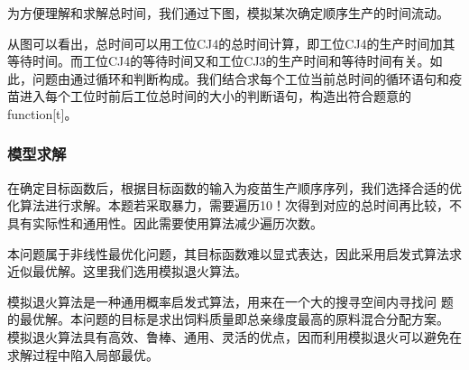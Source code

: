 \documentclass[UTF8]{ctexart}
\begin{document}
	为方便理解和求解总时间，我们通过下图，模拟某次确定顺序生产的时间流动。

	从图可以看出，总时间可以用工位CJ4的总时间计算，即工位CJ4的生产时间加其等待时间。而工位CJ4的等待时间又和工位CJ3的生产时间和等待时间有关。如此，问题由通过循环和判断构成。我们结合求每个工位当前总时间的循环语句和疫苗进入每个工位时前后工位总时间的大小的判断语句，构造出符合题意的function[t]。
	
	\subsubsection{模型求解}
	
	在确定目标函数后，根据目标函数的输入为疫苗生产顺序序列，我们选择合适的优化算法进行求解。本题若采取暴力，需要遍历10！次得到对应的总时间再比较，不具有实际性和通用性。因此需要使用算法减少遍历次数。
	
	本问题属于非线性最优化问题，其目标函数难以显式表达，因此采用启发式算法求近似最优解。这里我们选用模拟退火算法。 
	
	模拟退火算法是一种通用概率启发式算法，用来在一个大的搜寻空间内寻找问 题的最优解。本问题的目标是求出饲料质量即总亲缘度最高的原料混合分配方案。 模拟退火算法具有高效、鲁棒、通用、灵活的优点，因而利用模拟退火可以避免在 求解过程中陷入局部最优。
	
\end{document}
